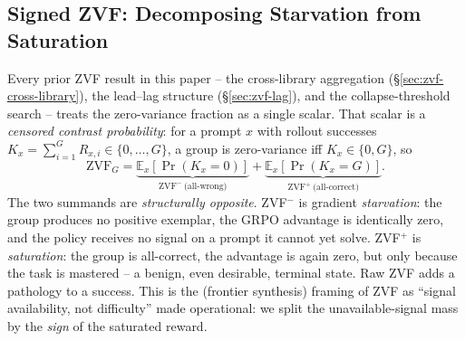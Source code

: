 
\subsection{Signed ZVF: Decomposing Starvation from Saturation}
\label{sec:zvf-signed}
Every prior ZVF result in this paper -- the cross-library aggregation
(\S\ref{sec:zvf-cross-library}), the lead--lag structure
(\S\ref{sec:zvf-lag}), and the collapse-threshold search -- treats the
zero-variance fraction as a single scalar. That scalar is a
\emph{censored contrast probability}: for a prompt $x$ with rollout
successes $K_x{=}\sum_{i=1}^{G} R_{x,i} \in \{0,\dots,G\}$, a group is
zero-variance iff $K_x{\in}\{0,G\}$, so
\begin{equation}
\mathrm{ZVF}_G = \underbrace{\mathbb{E}_x\!\left[\Pr(K_x{=}0)\right]}_{\text{ZVF}^-\ \text{(all-wrong)}}
             + \underbrace{\mathbb{E}_x\!\left[\Pr(K_x{=}G)\right]}_{\text{ZVF}^+\ \text{(all-correct)}}.
\end{equation}
The two summands are \emph{structurally opposite}. ZVF$^-$ is
gradient \emph{starvation}: the group produces no positive exemplar, the
GRPO advantage is identically zero, and the policy receives no signal on
a prompt it cannot yet solve. ZVF$^+$ is \emph{saturation}: the group is
all-correct, the advantage is again zero, but only because the task is
mastered -- a benign, even desirable, terminal state. Raw ZVF adds a
pathology to a success. This is the (frontier synthesis) framing of ZVF
as ``signal availability, not difficulty'' made operational: we split
the unavailable-signal mass by the \emph{sign} of the saturated reward.

